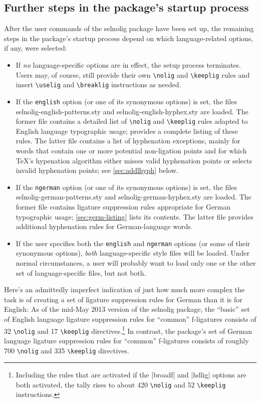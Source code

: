 \documentclass[11pt]{article}
\newcommand{\pkg}[1]{\textsf{#1}}
\newcommand{\opt}[1]{\texttt{#1}}
\newcommand{\cmmd}[1]{\texttt{\textbackslash #1}}
\begin{document}
\subsection{Further steps in the package's startup process}

After the user commands of the \pkg{selnolig} package have been set up, the remaining steps in the package's startup process depend on which language-related options, if any, were selected:
\begin{itemize}
\item If \emph{no} language-specific options are in effect, the setup process terminates. Users may, of course, still provide their own \cmmd{nolig} and \cmmd{keeplig} rules and insert \cmmd{uselig} and \cmmd{breaklig} instructions as needed.

\item If the \opt{english} option (or one of its synonymous options) is set, the files \pkg{selnolig-english-patterns.sty} and \pkg{selnolig-english-hyphex.sty} are loaded. The former file contains a detailed list of \cmmd{nolig} and \cmmd{keeplig} rules adapted to English language typographic usage;  provides a complete listing of these rules. The latter file contains a list of hyphenation exceptions, mainly for words that contain one or more potential non-ligation points and for which \TeX's hypenation algorithm either misses valid hyphenation points or selects invalid hyphenation points; see \cref{sec:addlhyph} below.

\item If the \opt{ngerman} option (or one of its synonymous options) is set, the files \pkg{selnolig-german-patterns.sty} and \pkg{selnolig-german-hyphex.sty} are loaded. The former file contains ligature suppression rules appropriate for German typographic usage; \cref{sec:germ-listing} lists its contents. The latter file provides additional hyphenation rules for German-language words.

\item If the user specifies both the \opt{english} and \opt{ngerman} options (or some of their synonymous options), \emph{both} language-specific style files will be loaded. Under normal circumstances, a user will probably want to load only one or the other set of language-specific files, but not both.
\end{itemize}

Here's an admittedly imperfect indication of just how much more complex the task is of creating a set of ligature suppression rules for German than it is for English: As of the mid-May 2013 version of the \pkg{selnolig} package, the \enquote{basic} set of English language ligature suppression rules for \enquote{common} f-ligatures consists of 32 \cmmd{nolig} and 17 \cmmd{keeplig} directives.\footnote{Including the rules that are activated if the |broadf| and |hdlig| options are both activated, the tally rises to about 420 \cmmd{nolig} and 52 \cmmd{keeplig} instructions.} In contrast, the package's set of German language ligature suppression rules for \enquote{common} f-ligatures consists of roughly 700 \cmmd{nolig} and 335 \cmmd{keeplig} directives.
\end{document}
